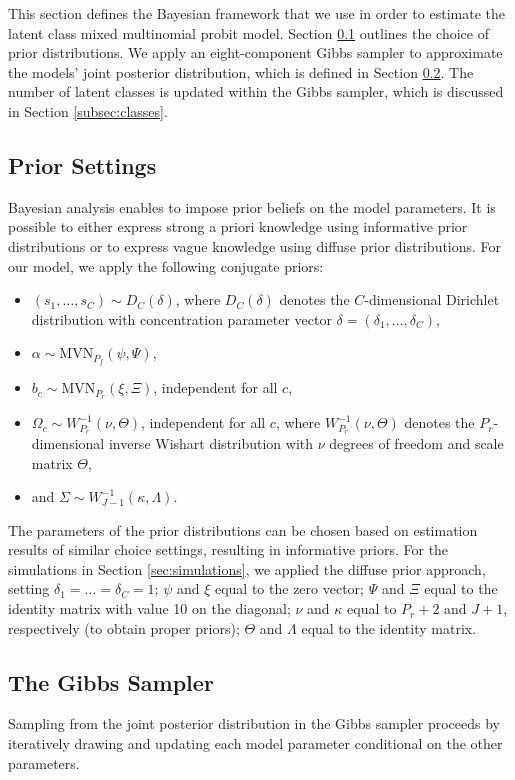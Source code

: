 \documentclass[article]{jss}
\newcommand{\MVN}[1]{\text{MVN}_{#1}}
\begin{document}
This section defines the Bayesian framework that we use in order to estimate the latent class mixed multinomial probit model. Section \ref{subsec:prior} outlines the choice of prior distributions. We apply an eight-component Gibbs sampler to approximate the models' joint posterior distribution, which is defined in Section \ref{subsec:gibbs}. The number of latent classes is updated within the Gibbs sampler, which is discussed in Section \ref{subsec:classes}.

\subsection{Prior Settings} \label{subsec:prior}

Bayesian analysis enables to impose prior beliefs on the model parameters. It is possible to either express strong a priori knowledge using informative prior distributions or to express vague knowledge using diffuse prior distributions. For our model, we apply the following conjugate priors:
\begin{itemize}
	\item $(s_1,\dots,s_C)\sim D_C(\delta)$, where $D_C(\delta)$ denotes the $C$-dimensional Dirichlet distribution with concentration parameter vector $\delta = (\delta_1,\dots,\delta_C)$,
	\item $\alpha\sim \MVN{P_f}(\psi,\Psi)$,
	\item $b_c \sim \MVN{P_r}(\xi,\Xi)$, independent for all $c$,
	\item $\Omega_c \sim W^{-1}_{P_r}(\nu,\Theta)$, independent for all $c$, where $W^{-1}_{P_r}(\nu,\Theta)$ denotes the $P_r$-dimensional inverse Wishart distribution with $\nu$ degrees of freedom and scale matrix $\Theta$,
	\item and $\Sigma \sim W^{-1}_{J-1}(\kappa,\Lambda)$.
\end{itemize}
The parameters of the prior distributions can be chosen based on estimation results of similar choice settings, resulting in informative priors. For the simulations in Section \ref{sec:simulations}, we applied the diffuse prior approach, setting $\delta_1=\dots=\delta_C=1$; $\psi$ and $\xi$ equal to the zero vector; $\Psi$ and $\Xi$ equal to the identity matrix with value 10 on the diagonal; $\nu$ and $\kappa$ equal to $P_r+2$ and $J+1$, respectively (to obtain proper priors); $\Theta$ and $\Lambda$ equal to the identity matrix.

\subsection{The Gibbs Sampler} \label{subsec:gibbs}
Sampling from the joint posterior distribution in the Gibbs sampler proceeds by iteratively drawing and updating each model parameter conditional on the other parameters.
\end{document}
